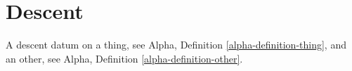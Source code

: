 \section{Descent}

\begin{definition}
\label{definition-descent}
A descent datum on a thing, see Alpha, Definition
\ref{alpha-definition-thing}, and an other, see Alpha, Definition
\ref{alpha-definition-other}.
\end{definition}
